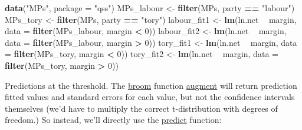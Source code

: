 \documentclass[]{book}
\newenvironment{Shaded}{\begin{snugshade}}{\end{snugshade}}
\newcommand{\DataTypeTok}[1]{\textcolor[rgb]{0.13,0.29,0.53}{#1}}
\newcommand{\DecValTok}[1]{\textcolor[rgb]{0.00,0.00,0.81}{#1}}
\newcommand{\KeywordTok}[1]{\textcolor[rgb]{0.13,0.29,0.53}{\textbf{#1}}}
\newcommand{\NormalTok}[1]{#1}
\newcommand{\OperatorTok}[1]{\textcolor[rgb]{0.81,0.36,0.00}{\textbf{#1}}}
\newcommand{\StringTok}[1]{\textcolor[rgb]{0.31,0.60,0.02}{#1}}
\theoremstyle{definition}
\theoremstyle{definition}
\theoremstyle{definition}
\theoremstyle{remark}
\begin{document}
\begin{Shaded}
\begin{Highlighting}[]
\KeywordTok{data}\NormalTok{(}\StringTok{"MPs"}\NormalTok{, }\DataTypeTok{package =} \StringTok{"qss"}\NormalTok{)}
\NormalTok{MPs_labour <-}\StringTok{ }\KeywordTok{filter}\NormalTok{(MPs, party }\OperatorTok{==}\StringTok{ "labour"}\NormalTok{)}
\NormalTok{MPs_tory <-}\StringTok{ }\KeywordTok{filter}\NormalTok{(MPs, party }\OperatorTok{==}\StringTok{ "tory"}\NormalTok{)}
\NormalTok{labour_fit1 <-}\StringTok{ }\KeywordTok{lm}\NormalTok{(ln.net }\OperatorTok{~}\StringTok{ }\NormalTok{margin, }\DataTypeTok{data =} \KeywordTok{filter}\NormalTok{(MPs_labour, margin }\OperatorTok{<}\StringTok{ }\DecValTok{0}\NormalTok{))}
\NormalTok{labour_fit2 <-}\StringTok{ }\KeywordTok{lm}\NormalTok{(ln.net }\OperatorTok{~}\StringTok{ }\NormalTok{margin, }\DataTypeTok{data =} \KeywordTok{filter}\NormalTok{(MPs_labour, margin }\OperatorTok{>}\StringTok{ }\DecValTok{0}\NormalTok{))}
\NormalTok{tory_fit1 <-}\StringTok{ }\KeywordTok{lm}\NormalTok{(ln.net }\OperatorTok{~}\StringTok{ }\NormalTok{margin, }\DataTypeTok{data =} \KeywordTok{filter}\NormalTok{(MPs_tory, margin }\OperatorTok{<}\StringTok{ }\DecValTok{0}\NormalTok{))}
\NormalTok{tory_fit2 <-}\StringTok{ }\KeywordTok{lm}\NormalTok{(ln.net }\OperatorTok{~}\StringTok{ }\NormalTok{margin, }\DataTypeTok{data =} \KeywordTok{filter}\NormalTok{(MPs_tory, margin }\OperatorTok{>}\StringTok{ }\DecValTok{0}\NormalTok{))}
\end{Highlighting}
\end{Shaded}

Predictions at the threshold. The
\href{https://cran.r-project.org/package=broom}{broom} function
\href{https://www.rdocumentation.org/packages/broom/topics/augment}{augment}
will return prediction fitted values and standard errors for each value,
but not the confidence intervals themselves (we'd have to multiply the
correct t-distribution with degrees of freedom.) So instead, we'll
directly use the
\href{https://www.rdocumentation.org/packages/stats/topics/predict.lm}{predict}
function:
\end{document}
